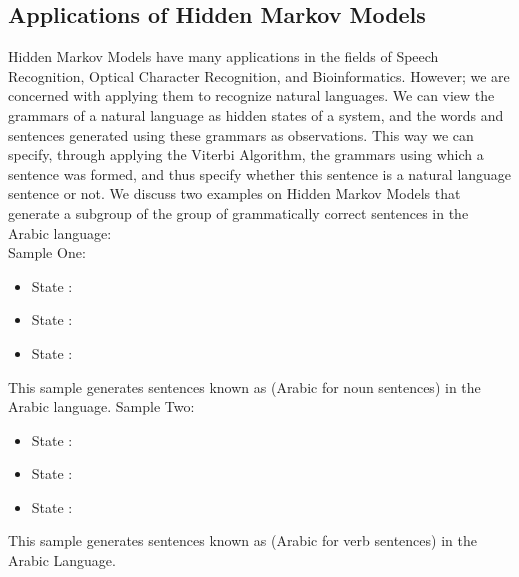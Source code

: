 \documentclass{acm_proc_article-sp}
\begin{document}
\subsection{Applications of Hidden Markov Models}\label{Applications-of-Hidden-Markov-Models}
Hidden Markov Models have many applications in the fields of Speech Recognition, Optical Character Recognition, and Bioinformatics. However; we are concerned with applying them to recognize natural languages. We can view the grammars of a natural language as hidden states of a system, and the words and sentences generated using these grammars as observations. This way we can specify, through applying the Viterbi Algorithm, the grammars using which a sentence was formed, and thus specify whether this sentence is a natural language sentence or not. We discuss two examples on Hidden Markov Models that generate a subgroup of the group of grammatically correct sentences in the Arabic language:\\
Sample One:
\begin{itemize}
    \item State : 
    \item State : 
    \item State : 
\end{itemize}
This sample generates sentences known as  (Arabic for noun sentences) in the Arabic language.
Sample Two:\\
\begin{itemize}
    \item State : 
    \item State : 
    \item State : 
\end{itemize}
This sample generates sentences known as  (Arabic for verb sentences) in the Arabic Language.
\end{document}
